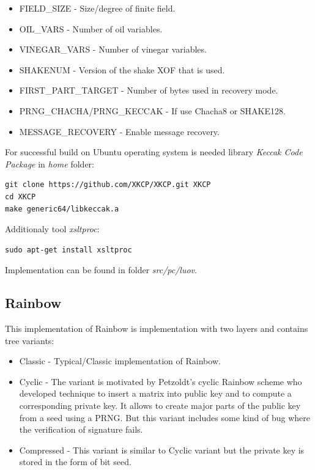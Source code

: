 \documentclass[thesis=M,english]{FITthesis}[2019/12/23]
\begin{document}
\begin{itemize}
\item	FIELD\_SIZE - Size/degree of finite field.
\item	OIL\_VARS - Number of oil variables.
\item	VINEGAR\_VARS - Number of vinegar variables.
\item	SHAKENUM - Version of the shake XOF that is used.
\item	FIRST\_PART\_TARGET - Number of bytes used in recovery mode.
\item	PRNG\_CHACHA/PRNG\_KECCAK - If use Chacha8 or SHAKE128. 
\item	MESSAGE\_RECOVERY - Enable message recovery.
\end{itemize}

For successful build on Ubuntu operating system is needed library \textit{Keccak Code Package} in \textit{home} folder:
\begin{lstlisting}[frame=single]
git clone https://github.com/XKCP/XKCP.git XKCP
cd XKCP
make generic64/libkeccak.a
\end{lstlisting}
Additionaly tool \textit{xsltproc}:
\begin{lstlisting}[frame=single]
sudo apt-get install xsltproc
\end{lstlisting}

\bigskip
\noindent
Implementation can be found in folder \textit{src/pc/luov}. 

\subsection{Rainbow}
This implementation of Rainbow is implementation with two layers and contains tree variants:
\begin{itemize}
\item	Classic - Typical/Classic implementation of Rainbow.
\item	Cyclic - The variant is motivated by Petzoldt's cyclic Rainbow scheme\cite{L-RB-CYC} who developed technique to insert a matrix into public key and to compute a corresponding private key. It allows to create major parts of the public key from a seed using a PRNG. But this variant includes some kind of bug where the verification of signature fails.
\item	Compressed - This variant is similar to Cyclic variant but the private key is stored in the form of bit seed.  
\end{itemize}
\end{document}
